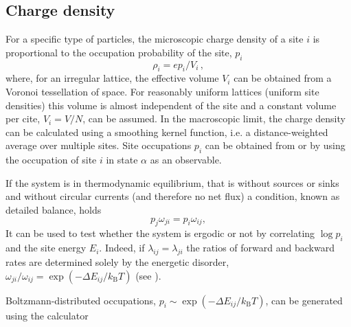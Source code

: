 \subsection{Charge density}
\label{sec:occupation}

For a specific type of particles, the microscopic charge density of a site $i$ is proportional to the occupation probability of the site, $p_i$
\begin{equation}
 \rho_i = e p_i / V_i\, ,
\end{equation}
where,  for an irregular lattice, the effective volume $V_i$ can be obtained from a Voronoi tessellation of space. For reasonably uniform lattices (uniform site densities) this volume is almost independent of the site and a constant volume per cite, $V_i = V/N$, can be assumed.  In the macroscopic limit, the charge density can be calculated using a smoothing kernel function, i.e. a distance-weighted average over multiple sites. Site occupations $p_i$ can be obtained from  or   by using the occupation of site $i$ in state $\alpha$ as an observable.

If the system is in thermodynamic equilibrium, that is without sources or sinks and without circular currents (and therefore no net flux) a condition, known as detailed balance, holds
%
\begin{equation}
\label{equ:detailed_balance}
  p_j \omega_{ji} = p_i \omega_{ij},
\end{equation}
%
It can be used to test whether the system is ergodic or not by correlating $\log p_i$ and the site energy $E_i$. Indeed, if $\lambda_{ij} = \lambda_{ji}$ the ratios of forward and backward rates are determined solely by the energetic disorder, $\omega_{ji} / \omega_{ij} = \exp(-\Delta E_{ij} / k_\text{B} T)$ (see ).

Boltzmann-distributed occupations, $p_i \sim \exp(-\Delta E_{ij} / k_\text{B} T)$, can be generated using the  calculator
\vskip 0.2cm
\label{sec:oboltzmann}
{\noindent \small \ctprun \opt \xmloptions   \sql  \sqlstate \exe {} }

